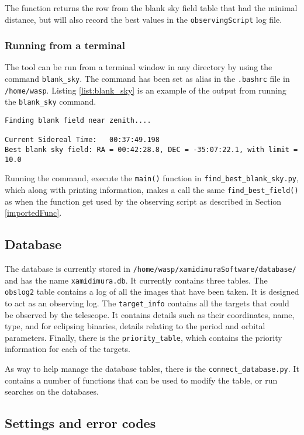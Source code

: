 \documentclass[a4paper,12pt]{article}
\begin{document}
{The function returns the row from the blank sky field table that had the minimal distance, but will also record the best values in the {\tt observingScript} log file.

\subsubsection{Running from a terminal}
The tool can be run from a terminal window in any directory by using the command {\tt blank\_sky}. The command has been set as alias in the {\tt .bashrc} file in {\tt /home/wasp}. Listing \ref{list:blank_sky} is an example of the output from running the {\tt blank\_sky} command.

\begin{lstlisting}[caption={Output from the {\tt blank\_sky} command}, label={list:blank_sky}]
Finding blank field near zenith....

Current Sidereal Time:	 00:37:49.198
Best blank sky field: RA = 00:42:28.8, DEC = -35:07:22.1, with limit = 10.0
\end{lstlisting}

Running the command, execute the {\tt main()} function in {\tt find\_best\_blank\_sky.py}, which along with printing information, makes a call the same {\tt find\_best\_field()} as when the function get used by the observing script as described in Section \ref{importedFunc}.

\subsection{Database}

The database is currently stored in {\tt /home/wasp/xamidimuraSoftware/database/} and has the name {\tt xamidimura.db}. It currently contains three tables. The {\tt obslog2} table contains a log of all the images that have been taken. It is designed to act as an observing log. The {\tt target\_info} contains all the targets that could be observed by the telescope. It contains details such as their coordinates, name, type, and for eclipsing binaries, details relating to the period and orbital parameters. Finally, there is the {\tt priority\_table}, which contains the priority information for each of the targets.

As way to help manage the database tables, there is the {\tt connect\_database.py}. It contains a number of functions that can be used to modify the table, or run searches on the databases.

\subsection{Settings and error codes}

}
\end{document}
